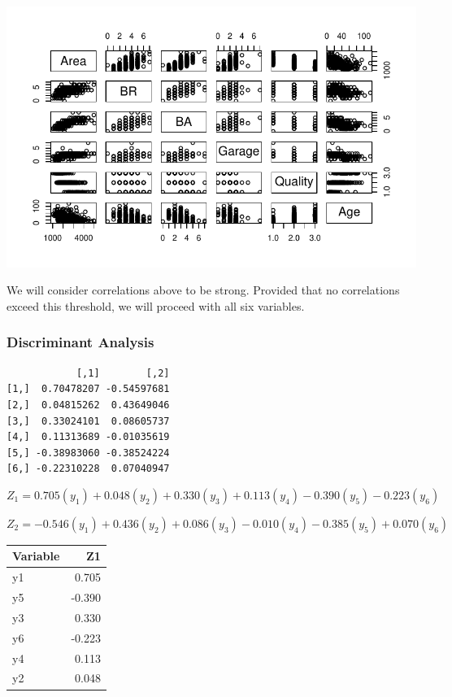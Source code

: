 \documentclass[
  letterpaper,
  DIV=11,
  numbers=noendperiod]{scrartcl}
\begin{document}
\includegraphics{final_project_files/figure-pdf/unnamed-chunk-12-1.pdf}

We will consider correlations above \textbar{} to be strong.
Provided that no correlations exceed this threshold, we will proceed
with all six variables.

\hypertarget{discriminant-analysis}{%
\subsubsection{Discriminant Analysis}\label{discriminant-analysis}}

\begin{verbatim}
            [,1]        [,2]
[1,]  0.70478207 -0.54597681
[2,]  0.04815262  0.43649046
[3,]  0.33024101  0.08605737
[4,]  0.11313689 -0.01035619
[5,] -0.38983060 -0.38524224
[6,] -0.22310228  0.07040947
\end{verbatim}

\[
Z_1 = 0.705(y_1) + 0.048(y_2) + 0.330(y_3) + 0.113(y_4) - 0.390(y_5) - 0.223(y_6)
\]

\[
Z_2 = -0.546(y_1) + 0.436(y_2) + 0.086(y_3) - 0.010(y_4) - 0.385(y_5) + 0.070(y_6)
\]

\begin{longtable}[]{@{}lr@{}}
\toprule\noalign{}
Variable & Z1 \\
\midrule\noalign{}
\endhead
\bottomrule\noalign{}
\endlastfoot
y1 & 0.705 \\
y5 & -0.390 \\
y3 & 0.330 \\
y6 & -0.223 \\
y4 & 0.113 \\
y2 & 0.048 \\
\end{longtable}
\end{document}
